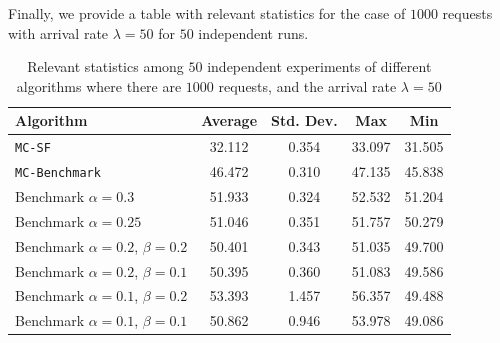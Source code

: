 \documentclass[11pt, a4paper]{article}
\theoremstyle{plain}
\theoremstyle{definition}
\theoremstyle{remark}
\newcommand{\mcsdf}{\texttt{MC-SF}}
\newcommand{\mcb}{\texttt{MC-Benchmark}}
\begin{document}
Finally, we provide a table with relevant statistics for the case of $1000$ requests with arrival rate $\lambda = 50$ for $50$ independent runs.

\begin{table}[ht]
\centering
\caption{Relevant statistics among $50$ independent experiments of different algorithms where there are $1000$ requests, and the arrival rate $\lambda=50$}
\begin{tabular}{lcccc}
\toprule
Algorithm & Average & Std. Dev. & Max & Min \\
\midrule
\mcsdf & 32.112 & 0.354 & 33.097 & 31.505 \\
\mcb & 46.472 & 0.310 & 47.135 & 45.838 \\
Benchmark $\alpha=0.3$ & 51.933 & 0.324 & 52.532 & 51.204 \\
Benchmark $\alpha=0.25$ & 51.046 & 0.351 & 51.757 & 50.279 \\
Benchmark $\alpha=0.2$, $\beta=0.2$ & 50.401 & 0.343 & 51.035 & 49.700 \\
Benchmark $\alpha=0.2$, $\beta=0.1$ & 50.395 & 0.360 & 51.083 & 49.586 \\
Benchmark $\alpha=0.1$, $\beta=0.2$ & 53.393 & 1.457 & 56.357 & 49.488 \\
Benchmark $\alpha=0.1$, $\beta=0.1$ & 50.862 & 0.946 & 53.978 & 49.086 \\
\bottomrule
\end{tabular}
\label{tab:performance}
\end{table}

\newpage
\end{document}
